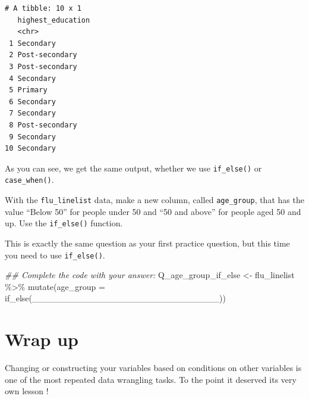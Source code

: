 \documentclass[
  letterpaper,
  DIV=11,
  numbers=noendperiod]{scrreprt}
\newenvironment{Shaded}{\begin{snugshade}}{\end{snugshade}}
\newcommand{\AttributeTok}[1]{\textcolor[rgb]{0.40,0.45,0.13}{#1}}
\newcommand{\DocumentationTok}[1]{\textcolor[rgb]{0.37,0.37,0.37}{\textit{#1}}}
\newcommand{\FunctionTok}[1]{\textcolor[rgb]{0.28,0.35,0.67}{#1}}
\newcommand{\NormalTok}[1]{\textcolor[rgb]{0.00,0.23,0.31}{#1}}
\newcommand{\OtherTok}[1]{\textcolor[rgb]{0.00,0.23,0.31}{#1}}
\newcommand{\SpecialCharTok}[1]{\textcolor[rgb]{0.37,0.37,0.37}{#1}}
\begin{document}
\begin{verbatim}
# A tibble: 10 x 1
   highest_education
   <chr>            
 1 Secondary        
 2 Post-secondary   
 3 Post-secondary   
 4 Secondary        
 5 Primary          
 6 Secondary        
 7 Secondary        
 8 Post-secondary   
 9 Secondary        
10 Secondary        
\end{verbatim}

As you can see, we get the same output, whether we use
\texttt{if\_else()} or \texttt{case\_when()}.

\begin{tcolorbox}[enhanced jigsaw, colframe=quarto-callout-tip-color-frame, rightrule=.15mm, opacityback=0, breakable, coltitle=black, colbacktitle=quarto-callout-tip-color!10!white, bottomrule=.15mm, leftrule=.75mm, toprule=.15mm, arc=.35mm, bottomtitle=1mm, colback=white, left=2mm, opacitybacktitle=0.6, titlerule=0mm, title=\textcolor{quarto-callout-tip-color}{\faLightbulb}\hspace{0.5em}{Practice}, toptitle=1mm]

With the \texttt{flu\_linelist} data, make a new column, called
\texttt{age\_group}, that has the value ``Below 50'' for people under 50
and ``50 and above'' for people aged 50 and up. Use the
\texttt{if\_else()} function.

This is exactly the same question as your first practice question, but
this time you need to use \texttt{if\_else()}.

\begin{Shaded}
\begin{Highlighting}[]
\DocumentationTok{\#\# Complete the code with your answer:}
\NormalTok{Q\_age\_group\_if\_else }\OtherTok{\textless{}{-}} 
\NormalTok{  flu\_linelist }\SpecialCharTok{\%\textgreater{}\%} 
  \FunctionTok{mutate}\NormalTok{(}\AttributeTok{age\_group =} \FunctionTok{if\_else}\NormalTok{(\_\_\_\_\_\_\_\_\_\_\_\_\_\_\_\_\_\_\_\_\_\_\_\_\_\_\_\_\_\_))}
\end{Highlighting}
\end{Shaded}

\end{tcolorbox}

\hypertarget{wrap-up-6}{%
\section{Wrap up}\label{wrap-up-6}}

Changing or constructing your variables based on conditions on other
variables is one of the most repeated data wrangling tasks. To the point
it deserved its very own lesson !
\end{document}
